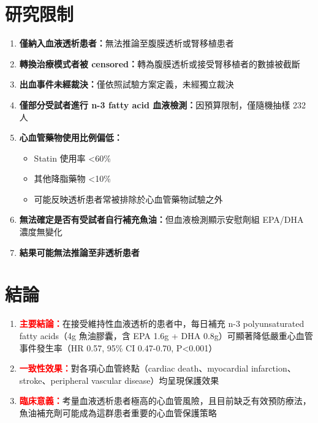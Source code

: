 \documentclass[12pt,a4paper]{article}
\begin{document}
\section{研究限制}

\begin{enumerate}
    \item \textbf{僅納入血液透析患者：}無法推論至腹膜透析或腎移植患者

    \item \textbf{轉換治療模式者被 censored：}轉為腹膜透析或接受腎移植者的數據被截斷

    \item \textbf{出血事件未經裁決：}僅依照試驗方案定義，未經獨立裁決

    \item \textbf{僅部分受試者進行 n-3 fatty acid 血液檢測：}因預算限制，僅隨機抽樣 232 人

    \item \textbf{心血管藥物使用比例偏低：}
    \begin{itemize}
        \item Statin 使用率 <60\%
        \item 其他降脂藥物 <10\%
        \item 可能反映透析患者常被排除於心血管藥物試驗之外
    \end{itemize}

    \item \textbf{無法確定是否有受試者自行補充魚油：}但血液檢測顯示安慰劑組 EPA/DHA 濃度無變化

    \item \textbf{結果可能無法推論至非透析患者}
\end{enumerate}

\section{結論}

\begin{enumerate}
    \item \textcolor{red}{\textbf{主要結論：}}在接受維持性血液透析的患者中，每日補充 n-3 polyunsaturated fatty acids（4g 魚油膠囊，含 EPA 1.6g + DHA 0.8g）可顯著降低嚴重心血管事件發生率（HR 0.57, 95\% CI 0.47-0.70, P<0.001）

    \item \textcolor{red}{\textbf{一致性效果：}}對各項心血管終點（cardiac death、myocardial infarction、stroke、peripheral vascular disease）均呈現保護效果

    \item \textcolor{red}{\textbf{臨床意義：}}考量血液透析患者極高的心血管風險，且目前缺乏有效預防療法，魚油補充劑可能成為這群患者重要的心血管保護策略
\end{enumerate}
\end{document}
